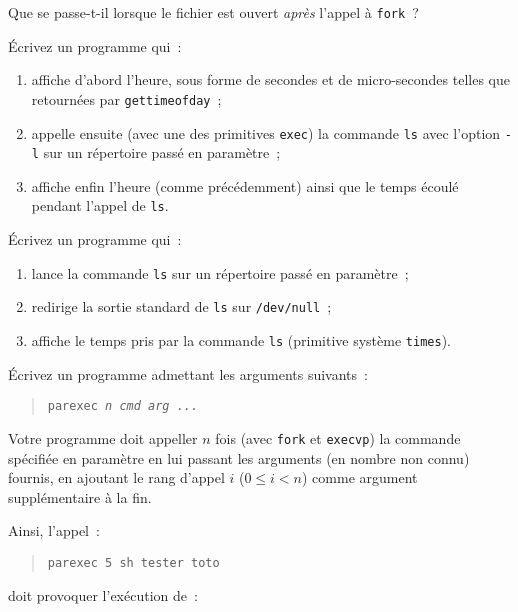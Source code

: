 Que se passe-t-il lorsque le fichier est ouvert {\em après} l'appel à
{\tt fork}~?


\question

Écrivez un programme qui~:

\begin {enumerate}
    \item affiche d'abord l'heure, sous forme de secondes et de
	micro-secondes telles que retournées par \texttt {gettimeofday}~;

    \item appelle ensuite (avec une des primitives \texttt {exec})
	la commande \texttt {ls} avec l'option \texttt {-l} sur un
	répertoire passé en paramètre~;

    \item affiche enfin l'heure (comme précédemment) ainsi que le
	temps écoulé pendant l'appel de \texttt {ls}.

\end {enumerate}


\question

Écrivez un programme qui~:

\begin {enumerate}
    \item lance la commande {\tt ls} sur un répertoire passé en
        paramètre~;
    \item redirige la sortie standard de {\tt ls} sur {\tt /dev/null}~;
    \item affiche le temps pris par la commande {\tt ls} (primitive
	système {\tt times}).
\end {enumerate}


\question

Écrivez un programme admettant les arguments suivants~:

\begin {quote}
    \texttt {parexec \textit {n cmd arg ...}}
\end {quote}

Votre programme doit appeller $n$ fois (avec \texttt {fork} et \texttt
{execvp}) la commande spécifiée en paramètre en lui passant les
arguments (en nombre non connu) fournis, en ajoutant le rang d'appel $i$
($0 \leq i < n$) comme argument supplémentaire à la fin.

Ainsi, l'appel~:

\begin {quote}
    \texttt {parexec 5 sh tester toto}
\end {quote}

doit provoquer l'exécution de~:

